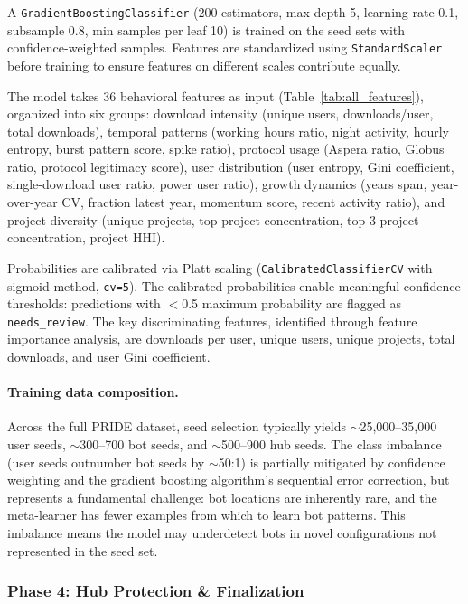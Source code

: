 \documentclass[11pt,a4paper]{article}
\begin{document}
A \texttt{GradientBoostingClassifier} (200 estimators, max depth 5, learning rate 0.1, subsample 0.8, min samples per leaf 10) is trained on the seed sets with confidence-weighted samples. Features are standardized using \texttt{StandardScaler} before training to ensure features on different scales contribute equally.

The model takes 36 behavioral features as input (Table~\ref{tab:all_features}), organized into six groups: download intensity (unique users, downloads/user, total downloads), temporal patterns (working hours ratio, night activity, hourly entropy, burst pattern score, spike ratio), protocol usage (Aspera ratio, Globus ratio, protocol legitimacy score), user distribution (user entropy, Gini coefficient, single-download user ratio, power user ratio), growth dynamics (years span, year-over-year CV, fraction latest year, momentum score, recent activity ratio), and project diversity (unique projects, top project concentration, top-3 project concentration, project HHI).

Probabilities are calibrated via Platt scaling (\texttt{CalibratedClassifierCV} with sigmoid method, \texttt{cv=5}). The calibrated probabilities enable meaningful confidence thresholds: predictions with $<$0.5 maximum probability are flagged as \texttt{needs\_review}. The key discriminating features, identified through feature importance analysis, are downloads per user, unique users, unique projects, total downloads, and user Gini coefficient.

\paragraph{Training data composition.} Across the full PRIDE dataset, seed selection typically yields $\sim$25,000--35,000 user seeds, $\sim$300--700 bot seeds, and $\sim$500--900 hub seeds. The class imbalance (user seeds outnumber bot seeds by $\sim$50:1) is partially mitigated by confidence weighting and the gradient boosting algorithm's sequential error correction, but represents a fundamental challenge: bot locations are inherently rare, and the meta-learner has fewer examples from which to learn bot patterns. This imbalance means the model may underdetect bots in novel configurations not represented in the seed set.

\subsubsection{Phase 4: Hub Protection \& Finalization}
\end{document}

